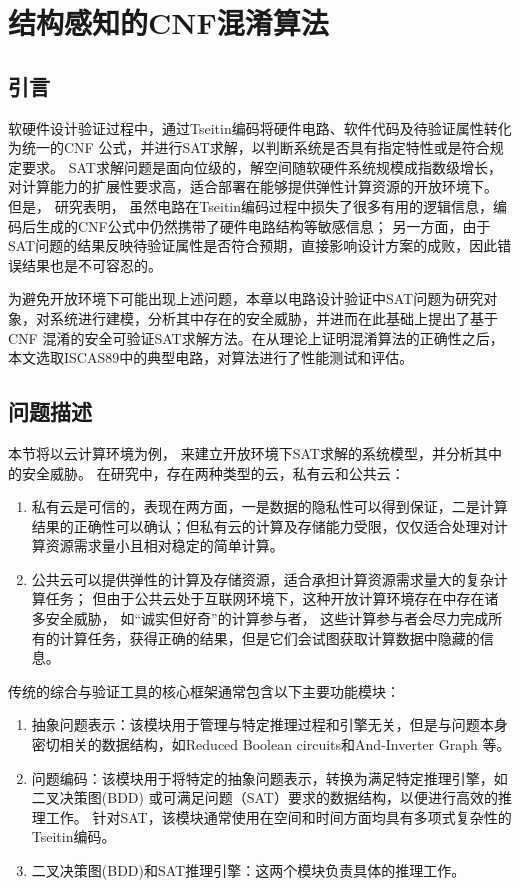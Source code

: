\chapter{结构感知的CNF混淆算法}
\label{chap:3}

\section{引言}%
软硬件设计验证过程中，通过Tseitin编码将硬件电路、软件代码及待验证属性转化为统一的CNF
公式，并进行SAT求解，以判断系统是否具有指定特性或是符合规定要求。
SAT求解问题是面向位级的，解空间随软硬件系统规模成指数级增长，对计算能力的扩展性要求高，适合部署在能够提供弹性计算资源的开放环境下。
但是，
研究表明，
虽然电路在Tseitin编码过程中损失了很多有用的逻辑信息，编码后生成的CNF公式中仍然携带了硬件电路结构等敏感信息；
另一方面，由于SAT问题的结果反映待验证属性是否符合预期，直接影响设计方案的成败，因此错误结果也是不可容忍的。

为避免开放环境下可能出现上述问题，本章以电路设计验证中SAT问题为研究对象，对系统进行建模，分析其中存在的安全威胁，并进而在此基础上提出了基于CNF 混淆的安全可验证SAT求解方法。在从理论上证明混淆算法的正确性之后，本文选取ISCAS89中的典型电路，对算法进行了性能测试和评估。

\section{问题描述}
本节将以云计算环境为例，
来建立开放环境下SAT求解的系统模型，并分析其中的安全威胁。
在研究中，存在两种类型的云，私有云和公共云：
\begin{enumerate}
\item 私有云是可信的，表现在两方面，一是数据的隐私性可以得到保证，二是计算结果的正确性可以确认；但私有云的计算及存储能力受限，仅仅适合处理对计算资源需求量小且相对稳定的简单计算。
\item 公共云可以提供弹性的计算及存储资源，适合承担计算资源需求量大的复杂计算任务；
但由于公共云处于互联网环境下，这种开放计算环境存在中存在诸多安全威胁，
如“诚实但好奇”的计算参与者，
这些计算参与者会尽力完成所有的计算任务，获得正确的结果，但是它们会试图获取计算数据中隐藏的信息。
\end{enumerate}

传统的综合与验证工具的核心框架通常包含以下主要功能模块：
\begin{enumerate}
\item 抽象问题表示：该模块用于管理与特定推理过程和引擎无关，但是与问题本身密切相关的数据结构，如Reduced Boolean circuits和And-Inverter Graph 等。
\item 问题编码：该模块用于将特定的抽象问题表示，转换为满足特定推理引擎，如二叉决策图(BDD) 或可满足问题（SAT）要求的数据结构，以便进行高效的推理工作。
针对SAT，该模块通常使用在空间和时间方面均具有多项式复杂性的Tseitin编码。
\item 二叉决策图(BDD)和SAT推理引擎：这两个模块负责具体的推理工作。
\end{enumerate}

